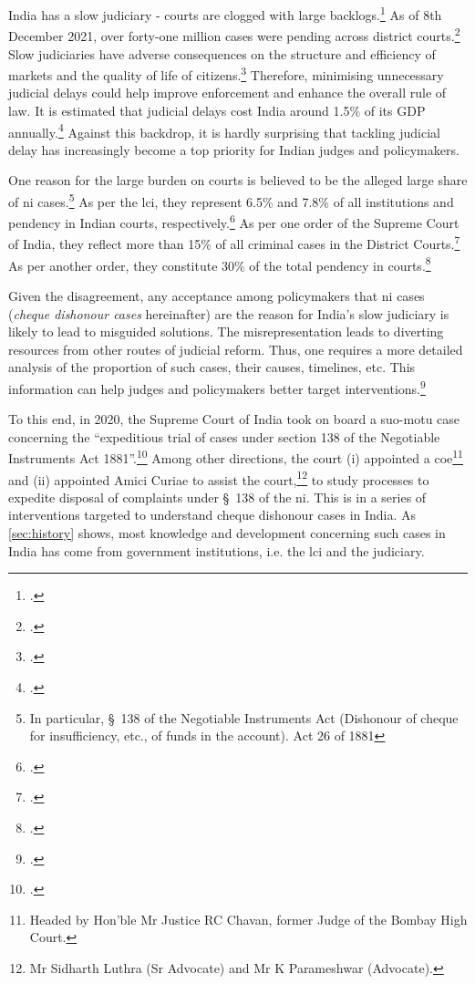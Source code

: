India has a slow judiciary - courts are clogged with large backlogs.\footcite{moog1992delays, debroy2008justice, dutta2019modernise} As of 8th December 2021, over forty-one million cases were pending across district courts.\footcite{njdg2021} Slow judiciaries have adverse consequences on the structure and efficiency of markets and the quality of life of citizens.\footcite{world2004world, chemin2007impact} Therefore, minimising unnecessary judicial delays could help improve enforcement and enhance the overall rule of law. It is estimated that judicial delays cost India around 1.5\% of its GDP annually.\footcite{dey2016_cost} Against this backdrop, it is hardly surprising that tackling judicial delay has increasingly become a top priority for Indian judges and policymakers.

One reason for the large burden on courts is believed to be the alleged large share of \gls{ni} cases.\footnote{In particular, \S~138 of the Negotiable Instruments Act (Dishonour of cheque for insufficiency, etc., of funds in the account). Act 26 of 1881} As per the \gls{lci}, they represent 6.5\% and 7.8\% of all institutions and pendency in Indian courts, respectively.\footcite{lci2014_arrears} As per one order of the Supreme Court of India, they reflect more than 15\% of all criminal cases in the District Courts.\footcite{sc2020_makwanavstate} As per another order, they constitute 30\% of the total pendency in courts.\footcite[Similarly, a study published by the Department of Justice briefly touches on the burden of such cases on the judiciary and posits that they constitute 34\% of pending criminal cases in Maharashtra.][]{sc2020_138, mahadik2018_maharashtra}

Given the disagreement, any acceptance among policymakers that \gls{ni} cases (\textit{cheque dishonour cases} hereinafter) are the reason for India's slow judiciary is likely to lead to misguided solutions. The misrepresentation leads to diverting resources from other routes of judicial reform. Thus, one requires a more detailed analysis of the proportion of such cases, their causes, timelines, etc. This information can help judges and policymakers better target interventions.\footcite[For the importance of accurate judicial data, see][]{damle2020_ecourtsData, daksh2020_data, damle2020_land}

To this end, in 2020, the Supreme Court of India took on board a suo-motu case concerning the “expeditious trial of cases under section 138 of the Negotiable Instruments Act 1881”.\footcite{sc2020_138} Among other directions, the court (i) appointed a \gls{coe}\footnote{Headed by Hon’ble Mr Justice RC Chavan, former Judge of the Bombay High Court.} and (ii) appointed Amici Curiae to assist the court,\footnote{Mr Sidharth Luthra (Sr Advocate) and Mr K Parameshwar (Advocate).} to study processes to expedite disposal of complaints under \S~138 of the \gls{ni}. This is in a series of interventions targeted to understand cheque dishonour cases in India. As \cref{sec:history} shows, most knowledge and development concerning such cases in India has come from government institutions, i.e. the \gls{lci} and the judiciary.

